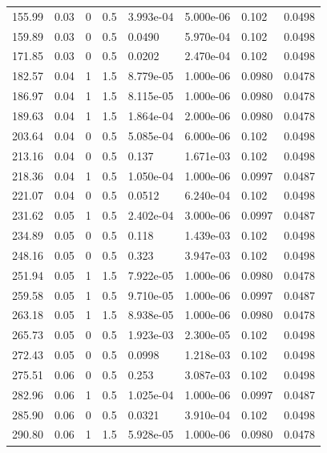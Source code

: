 \documentclass[preview]{standalone}
\begin{document}
{{\begin{tabular}{L{1.2cm}C{1.2cm} C{0.3cm}C{0.5cm} C{1.4cm}C{1.4cm} C{1.4cm}C{1.4cm}}
  155.99  &  0.03  & 0     & 0.5 &  3.993e-04  & 5.000e-06  & 0.102 &  0.0498   \\ 
  159.89  &  0.03  & 0     & 0.5 &  0.0490  & 5.970e-04  & 0.102 &  0.0498   \\ 
  171.85  &  0.03  & 0     & 0.5 &  0.0202  & 2.470e-04  & 0.102 &  0.0498   \\ 
  182.57  &  0.04  & 1     & 1.5 &  8.779e-05  & 1.000e-06  & 0.0980 &  0.0478   \\ 
  186.97  &  0.04  & 1     & 1.5 &  8.115e-05  & 1.000e-06  & 0.0980 &  0.0478   \\ 
  189.63  &  0.04  & 1     & 1.5 &  1.864e-04  & 2.000e-06  & 0.0980 &  0.0478   \\ 
  203.64  &  0.04  & 0     & 0.5 &  5.085e-04  & 6.000e-06  & 0.102 &  0.0498   \\ 
  213.16  &  0.04  & 0     & 0.5 &  0.137  & 1.671e-03  & 0.102 &  0.0498   \\ 
  218.36  &  0.04  & 1     & 0.5 &  1.050e-04  & 1.000e-06  & 0.0997 &  0.0487   \\ 
  221.07  &  0.04  & 0     & 0.5 &  0.0512  & 6.240e-04  & 0.102 &  0.0498   \\ 
  231.62  &  0.05  & 1     & 0.5 &  2.402e-04  & 3.000e-06  & 0.0997 &  0.0487   \\ 
  234.89  &  0.05  & 0     & 0.5 &  0.118  & 1.439e-03  & 0.102 &  0.0498   \\ 
  248.16  &  0.05  & 0     & 0.5 &  0.323  & 3.947e-03  & 0.102 &  0.0498   \\ 
  251.94  &  0.05  & 1     & 1.5 &  7.922e-05  & 1.000e-06  & 0.0980 &  0.0478   \\ 
  259.58  &  0.05  & 1     & 0.5 &  9.710e-05  & 1.000e-06  & 0.0997 &  0.0487   \\ 
  263.18  &  0.05  & 1     & 1.5 &  8.938e-05  & 1.000e-06  & 0.0980 &  0.0478   \\ 
  265.73  &  0.05  & 0     & 0.5 &  1.923e-03  & 2.300e-05  & 0.102 &  0.0498   \\ 
  272.43  &  0.05  & 0     & 0.5 &  0.0998  & 1.218e-03  & 0.102 &  0.0498   \\ 
  275.51  &  0.06  & 0     & 0.5 &  0.253  & 3.087e-03  & 0.102 &  0.0498   \\ 
  282.96  &  0.06  & 1     & 0.5 &  1.025e-04  & 1.000e-06  & 0.0997 &  0.0487   \\ 
  285.90  &  0.06  & 0     & 0.5 &  0.0321  & 3.910e-04  & 0.102 &  0.0498   \\ 
  290.80  &  0.06  & 1     & 1.5 &  5.928e-05  & 1.000e-06  & 0.0980 &  0.0478   \\ 

\end{tabular}}}
\end{document}
